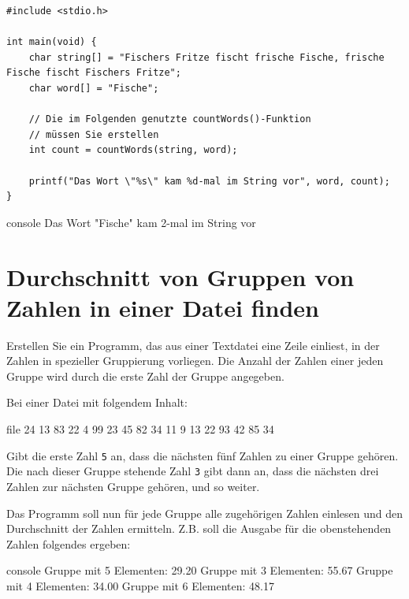 \Vorlage
\begin{verbatim}
#include <stdio.h>

int main(void) {
    char string[] = "Fischers Fritze fischt frische Fische, frische Fische fischt Fischers Fritze";
    char word[] = "Fische";

    // Die im Folgenden genutzte countWords()-Funktion
    // müssen Sie erstellen
    int count = countWords(string, word);

    printf("Das Wort \"%s\" kam %d-mal im String vor", word, count);
}
\end{verbatim}

\begin{mybox}[Bildschirmausgabe]{console}
Das Wort "Fische" kam 2-mal im String vor
\end{mybox}



\chapter{Durchschnitt von Gruppen von Zahlen in einer Datei finden}

\vspace{10pt}

Erstellen Sie ein Programm, das aus einer Textdatei eine Zeile einliest, in der
Zahlen in spezieller Gruppierung vorliegen. Die Anzahl der Zahlen einer jeden
Gruppe wird durch die erste Zahl der Gruppe angegeben.

Bei einer Datei mit folgendem Inhalt:

\begin{mybox}{file}
 24 13 83 22 4  99 23 45  82 34 11 9  13 22 93 42 85 34
\end{mybox}

Gibt die erste Zahl \texttt{5} an, dass die nächsten fünf Zahlen zu
einer Gruppe gehören. Die nach dieser Gruppe stehende Zahl \texttt{3}
gibt dann an, dass die nächsten drei Zahlen zur nächsten Gruppe gehören, und so
weiter.

Das Programm soll nun für jede Gruppe alle zugehörigen Zahlen einlesen und den
Durchschnitt der Zahlen ermitteln. Z.B. soll die Ausgabe für die obenstehenden
Zahlen folgendes ergeben:

\begin{mybox}[Bildschirmausgabe]{console}
Gruppe mit 5 Elementen: 29.20
Gruppe mit 3 Elementen: 55.67
Gruppe mit 4 Elementen: 34.00
Gruppe mit 6 Elementen: 48.17
\end{mybox}



